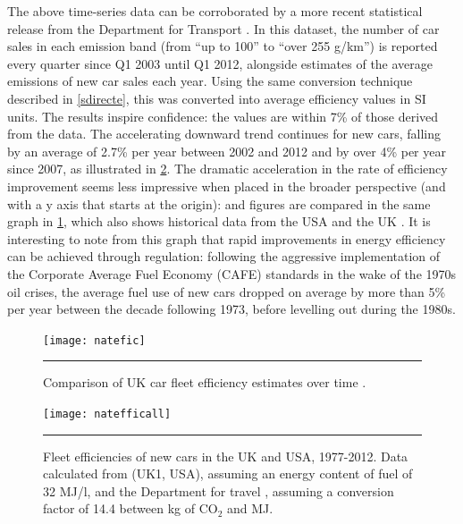The above time-series data can be corroborated by a more recent statistical
release from the Department for Transport \citep[table VEH0256]{Df2013licencing}.
In this dataset, the number of car sales in each emission band (from
``up to 100'' to ``over 255 g/km'') is reported every quarter since Q1 2003
until Q1 2012, alongside estimates of the average emissions of new car sales
each year. Using the same conversion technique described in \cref{sdirecte},
this was converted into average efficiency values in SI units. The results
inspire confidence: the values are within 7\% of those derived from
the \citet{Decc2011t} data. The accelerating downward trend continues for new cars,
falling by an average of 2.7\% per year between 2002 and 2012 and by over
4\% per year since 2007, as illustrated in \cref{fnatefic}.
The dramatic acceleration in the rate of efficiency improvement
seems less impressive when placed in the broader perspective (and with a
y axis that starts at the origin):
\citet{Df2013licencing} and \citet{Decc2011t} figures are compared in
the same graph in \cref{fnatefficall}, which also shows historical data from the USA
and the UK \citep{Schipper1993}. It is interesting to note from this graph
that rapid improvements in energy efficiency can be achieved through regulation:
following the aggressive implementation of the
Corporate Average Fuel Economy (CAFE) standards in the wake of the 1970s oil
crises, the average fuel use of new cars dropped on average by more than 5\%
per year between the decade following 1973, before levelling out during the
1980s.


\begin{figure}[h]
  \centerline{
    \texttt{[image: natefic]}}
    \rule{35em}{0.5pt}
  \caption{Comparison of UK car fleet efficiency estimates over time \citep{Df2013licencing}.}
  \label{fnatefficall}
\end{figure}


\begin{figure}[h]
  \centerline{
    \texttt{[image: natefficall]}}
    \rule{35em}{0.5pt}
  \caption[Fleet efficiencies of new cars in the UK and USA, 1977-2012]
  {Fleet efficiencies of new cars in the UK and USA, 1977-2012.
  Data calculated from 
  \citet{Schipper1993} (UK1, USA), assuming an energy content of fuel of
  32 MJ/l, and the Department for travel
  \citep[table VEH0256]{Df2013licencing}, assuming a conversion factor
  of 14.4 between kg of CO$_2$ and MJ.}
  \label{fnatefic}
\end{figure}

